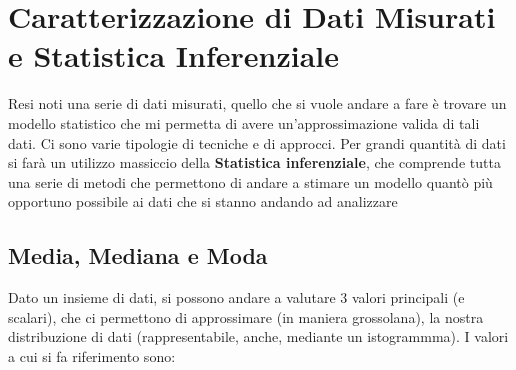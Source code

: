 \chapter{Caratterizzazione di Dati Misurati e Statistica Inferenziale}
Resi noti una serie di dati misurati, quello che si vuole andare a fare è trovare un modello statistico che mi permetta di avere un'approssimazione valida di tali dati. Ci sono varie tipologie di tecniche e di approcci. Per grandi quantità di dati si farà un utilizzo massiccio della \textbf{Statistica inferenziale}, che comprende tutta una serie di metodi che permettono di andare a stimare un modello quantò più opportuno possibile ai dati che si stanno andando ad analizzare

\section{Media, Mediana e Moda}
Dato un insieme di dati, si possono andare a valutare 3 valori principali (e scalari), che ci permettono di approssimare (in maniera grossolana), la nostra distribuzione di dati (rappresentabile, anche, mediante un istogrammma). I valori a cui si fa riferimento sono:
